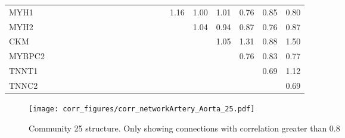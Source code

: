 \begin{longtable}{lrrrrrrrrrrrrrrrrrrrr}
MYH1         &             &             &             &             &               &            &                    &            &            &             &              &            &             &            &       1.16 &      1.00 &         1.01 &        0.76 &        0.85 &     0.80 \\
MYH2         &             &             &             &             &               &            &                    &            &            &             &              &            &             &            &            &      1.04 &         0.94 &        0.87 &        0.76 &     0.87 \\
CKM          &             &             &             &             &               &            &                    &            &            &             &              &            &             &            &            &           &         1.05 &        1.31 &        0.88 &     1.50 \\
MYBPC2       &             &             &             &             &               &            &                    &            &            &             &              &            &             &            &            &           &              &        0.76 &        0.83 &     0.77 \\
TNNT1        &             &             &             &             &               &            &                    &            &            &             &              &            &             &            &            &           &              &             &        0.69 &     1.12 \\
TNNC2        &             &             &             &             &               &            &                    &            &            &             &              &            &             &            &            &           &              &             &             &     0.69 \\
\end{longtable}


\begin{figure}[h!]
\centering
\texttt{[image: corr\_figures/corr\_networkArtery\_Aorta\_25.pdf]}
\caption{Community 25 structure. Only showing connections with correlation greater than 0.8}
\end{figure}


